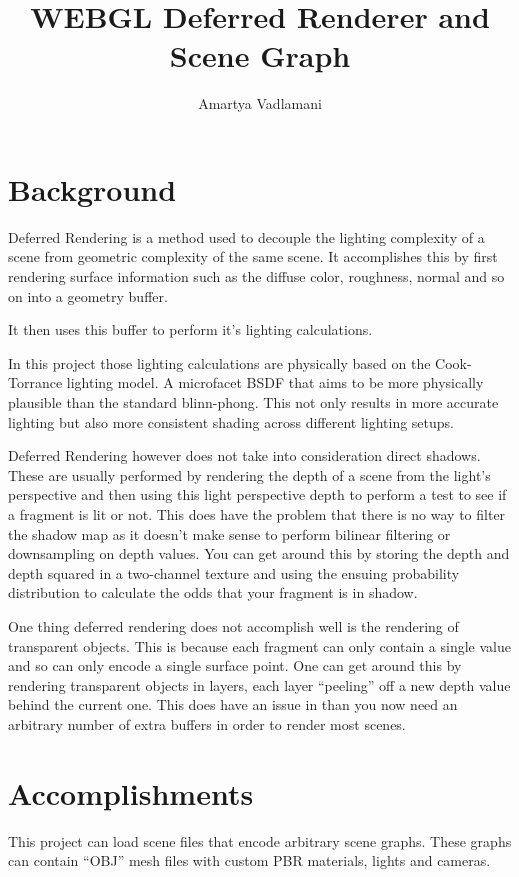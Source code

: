 \documentclass{article}
\author{Amartya Vadlamani}
\title{WEBGL Deferred Renderer and Scene Graph}
\date{}
\begin{document}
\maketitle

\section{Background}

Deferred Rendering is a method used to decouple the lighting complexity of a
scene from geometric complexity of the same scene. It accomplishes this by
first rendering surface information such as the diffuse color, roughness,
normal and so on into a geometry buffer.

It then uses this buffer to perform it's lighting calculations. 

In this project those lighting calculations are physically based on the
Cook-Torrance lighting model. A microfacet BSDF that aims to be more physically
plausible than the standard blinn-phong. This not only results in more
accurate lighting but also more consistent shading across different lighting setups.

Deferred Rendering however does not take into consideration direct shadows.
These are usually performed by rendering the depth of a scene from the light's
perspective and then using this light perspective depth to perform a test to
see if a fragment is lit or not. This does have the problem that there is no
way to filter the shadow map as it doesn't make sense to perform bilinear
filtering or downsampling on depth values. You can get around this by storing
the depth and depth squared in a two-channel texture and using the ensuing
probability distribution to calculate the odds that your fragment is in shadow.

One thing deferred rendering does not accomplish well is the rendering of
transparent objects. This is because each fragment can only contain a single
value and so can only encode a single surface point. One can get around this by
rendering transparent objects in layers, each layer ``peeling'' off a new depth
value behind the current one. This does have an issue in than you now need an
arbitrary number of extra buffers in order to render most scenes.

\section{Accomplishments}

This project can load scene files that encode arbitrary scene graphs. These
graphs can contain ``OBJ'' mesh files with custom PBR materials, lights and
cameras.
\end{document}
